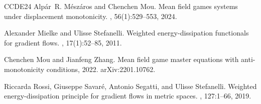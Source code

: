\documentclass{amsart}
\theoremstyle{remark}
\theoremstyle{definition}
\theoremstyle{Claim}
\theoremstyle{plain}
\begin{document}
\begin{thebibliography}{CCDE24}
Alp\'{a}r~R. M\'{e}sz\'{a}ros and Chenchen Mou.
\newblock Mean field games systems under displacement monotonicity.
, 56(1):529--553, 2024.

Alexander Mielke and Ulisse Stefanelli.
\newblock Weighted energy-dissipation functionals for gradient flows.
, 17(1):52--85, 2011.

Chenchen Mou and Jianfeng Zhang.
\newblock Mean field game master equations with anti-monotonicity conditions,
  2022.
\newblock arXiv:2201.10762.

Riccarda Rossi, Giuseppe Savar\'e, Antonio Segatti, and Ulisse Stefanelli.
\newblock Weighted energy-dissipation principle for gradient flows in metric
  spaces.
, 127:1--66, 2019.

\end{thebibliography}
\end{document}
